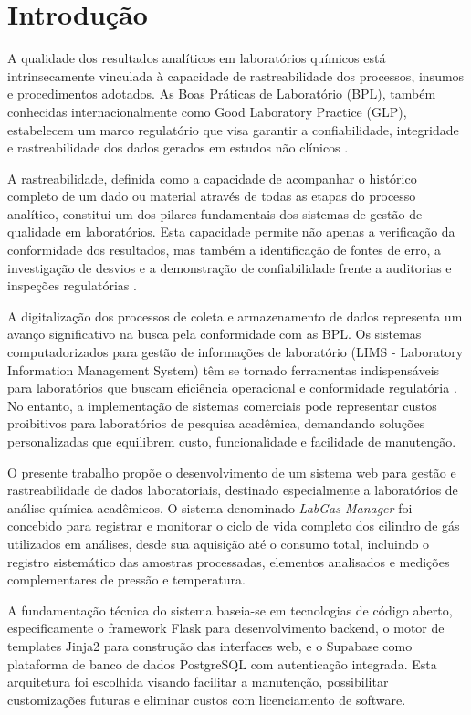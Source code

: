 \documentclass[12pt,a4paper]{article}
\begin{document}

\section{Introdução}

A qualidade dos resultados analíticos em laboratórios químicos está intrinsecamente vinculada à capacidade de rastreabilidade dos processos, insumos e procedimentos adotados. As Boas Práticas de Laboratório (BPL), também conhecidas internacionalmente como Good Laboratory Practice (GLP), estabelecem um marco regulatório que visa garantir a confiabilidade, integridade e rastreabilidade dos dados gerados em estudos não clínicos \cite{anvisa2009,oecd1998}.

A rastreabilidade, definida como a capacidade de acompanhar o histórico completo de um dado ou material através de todas as etapas do processo analítico, constitui um dos pilares fundamentais dos sistemas de gestão de qualidade em laboratórios. Esta capacidade permite não apenas a verificação da conformidade dos resultados, mas também a identificação de fontes de erro, a investigação de desvios e a demonstração de confiabilidade frente a auditorias e inspeções regulatórias \cite{iso2017,inmetro2018}.

A digitalização dos processos de coleta e armazenamento de dados representa um avanço significativo na busca pela conformidade com as BPL. Os sistemas computadorizados para gestão de informações de laboratório (LIMS - Laboratory Information Management System) têm se tornado ferramentas indispensáveis para laboratórios que buscam eficiência operacional e conformidade regulatória \cite{allison2015,wang2018}. No entanto, a implementação de sistemas comerciais pode representar custos proibitivos para laboratórios de pesquisa acadêmica, demandando soluções personalizadas que equilibrem custo, funcionalidade e facilidade de manutenção.

O presente trabalho propõe o desenvolvimento de um sistema web para gestão e rastreabilidade de dados laboratoriais, destinado especialmente a laboratórios de análise química acadêmicos. O sistema denominado \textit{LabGas Manager} foi concebido para registrar e monitorar o ciclo de vida completo dos cilindro de gás utilizados em análises, desde sua aquisição até o consumo total, incluindo o registro sistemático das amostras processadas, elementos analisados e medições complementares de pressão e temperatura.

A fundamentação técnica do sistema baseia-se em tecnologias de código aberto, especificamente o framework Flask para desenvolvimento backend, o motor de templates Jinja2 para construção das interfaces web, e o Supabase como plataforma de banco de dados PostgreSQL com autenticação integrada. Esta arquitetura foi escolhida visando facilitar a manutenção, possibilitar customizações futuras e eliminar custos com licenciamento de software.
\end{document}
